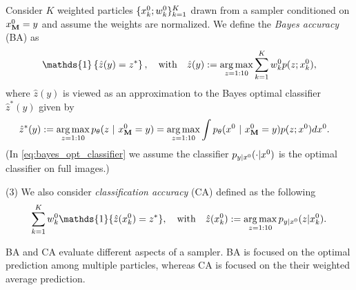 Consider $K$ weighted particles $\{ x^{0}_k; w^{0}_k\}_{k=1}^K$ drawn from a sampler conditioned on $x^{0}_{\mathbf{M}} = y$ and assume the weights are normalized. 
We define the \emph{Bayes accuracy} (BA) as 
\begin{align}\label{eq:BA}
    \mathds{1} \left\{ \hat z(y)= z^* \right\}, \quad  
   \mathrm{ with } \quad \hat z (y): = \argmax_{z=1:10} \sum_{k=1}^K \dt{w}{0}_k p(z;\xzero_k),  
\end{align}
where $\hat z(y)$ is viewed as an approximation to the Bayes optimal classifier $\hat z^* (y)$ given by 
\begin{align}\label{eq:bayes_opt_classifier}
\begin{split}
    \hat z^*(y) & := \operatorname*{arg\,max}_{z=1:10} p_{\theta}(z ~\vert~ x^{0}_{\mathbf{M}} = y) = \operatorname*{arg\,max}_{z=1:10} \int p_{\theta}(x^{0} ~\vert~ x^{0}_{\mathbf{M}} = y) p(z;  x^{0} )dx^{0}.
\end{split}
\end{align}
(In \cref{eq:bayes_opt_classifier} we assume the classifier $p_{y|x^{0}}({\cdot}|{x^{0}})$ is the optimal classifier on full images.)

(3) We also consider \emph{classification accuracy} (CA) defined as the following 
\begin{align}\label{eq:CA}
    \sum_{k=1}^K \dt{w}{0}_k \mathds{1} \{ \hat z(\xzero_k) = z^*\}, \quad \mathrm{ with } \quad \hat z(\xzero_k) := \argmax_{z=1:10} \plikelihood{z}{\xzero_k}. 
\end{align}

 BA and CA evaluate different aspects of a sampler. BA is focused on the optimal prediction among multiple particles, whereas CA is focused on the their weighted average prediction. 


